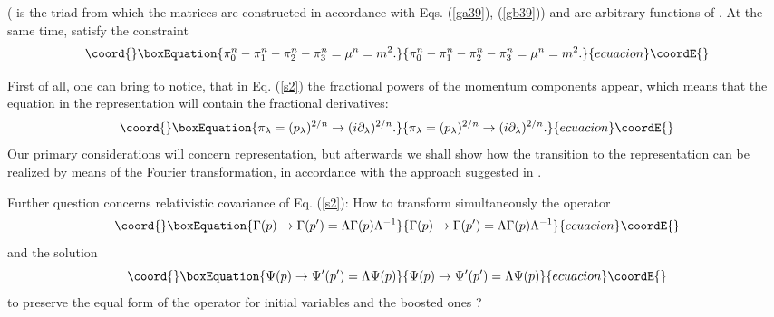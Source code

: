 \documentclass[a4paper,a4paper]{article}
\begin{document}
(\coordHE{} is the triad from which the matrices \coordHE{} are constructed in
accordance with Eqs. (\ref{ga39}), (\ref{gb39})) and \coordHE{}
are arbitrary functions of \coordHE{}. At the same time, \myHighlight{$\pi _{\lambda }$}\coordHE{} satisfy
the constraint 
\begin{equation}\coord{}\boxEquation{
\pi _{0}^{n}-\pi _{1}^{n}-\pi _{2}^{n}-\pi _{3}^{n}=\mu ^{n}=m^{2}.
\label{sb4}
}{
\pi _{0}^{n}-\pi _{1}^{n}-\pi _{2}^{n}-\pi _{3}^{n}=\mu ^{n}=m^{2}.
}{ecuacion}\coordE{}\end{equation}

First of all, one can bring to notice, that in Eq. (\ref{s2}) the fractional
powers of the momentum components appear, which means that the equation in
the \coordHE{}representation will contain the fractional derivatives: 
\begin{equation}\coord{}\boxEquation{
\pi _{\lambda }=(p_{\lambda })^{2/n}\rightarrow (i\partial _{\lambda
})^{2/n}.  \label{s5}
}{
\pi _{\lambda }=(p_{\lambda })^{2/n}\rightarrow (i\partial _{\lambda
})^{2/n}.  }{ecuacion}\coordE{}\end{equation}%
Our primary considerations will concern \coordHE{}representation, but afterwards
we shall show how the transition to the \coordHE{}representation can be realized
by means of the Fourier transformation, in accordance with the approach
suggested in \cite{zav}.

Further question concerns relativistic covariance of Eq. (\ref{s2}): How to
transform simultaneously the operator 
\begin{equation}\coord{}\boxEquation{
\Gamma (p)\rightarrow \Gamma (p^{\prime })=\Lambda \Gamma (p)\Lambda ^{-1}
\label{s6}
}{
\Gamma (p)\rightarrow \Gamma (p^{\prime })=\Lambda \Gamma (p)\Lambda ^{-1}
}{ecuacion}\coordE{}\end{equation}%
and the solution 
\begin{equation}\coord{}\boxEquation{
\Psi (p)\rightarrow \Psi ^{\prime }(p^{\prime })=\Lambda \Psi (p)  \label{s7}
}{
\Psi (p)\rightarrow \Psi ^{\prime }(p^{\prime })=\Lambda \Psi (p)  }{ecuacion}\coordE{}\end{equation}%
to preserve the equal form of the operator \myHighlight{$\Gamma $}\coordHE{} for initial variables \coordHE{} and the boosted ones \coordHE{} ?
\end{document}
